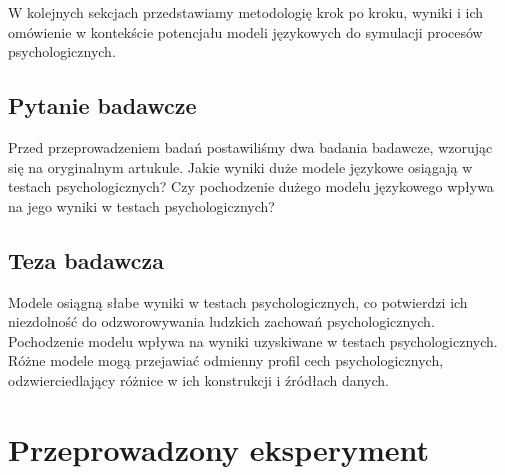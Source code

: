 \documentclass{article}
\begin{document}
W kolejnych sekcjach przedstawiamy metodologię krok po kroku, wyniki i ich omówienie w kontekście potencjału modeli językowych do symulacji procesów psychologicznych.
\subsection{Pytanie badawcze}
Przed przeprowadzeniem badań postawiliśmy dwa badania badawcze, wzorując się na oryginalnym artukule. 
Jakie wyniki duże modele językowe osiągają w testach psychologicznych? Czy pochodzenie dużego modelu językowego wpływa na jego wyniki w testach psychologicznych?

\subsection{Teza badawcza}
Modele osiągną słabe wyniki w testach psychologicznych, co potwierdzi ich niezdolność do odzworowywania ludzkich zachowań psychologicznych.
Pochodzenie modelu wpływa na wyniki uzyskiwane w testach psychologicznych. Różne modele mogą przejawiać odmienny profil cech psychologicznych, odzwierciedlający różnice w ich konstrukcji i źródłach danych.

\section{Przeprowadzony eksperyment}
\end{document}
